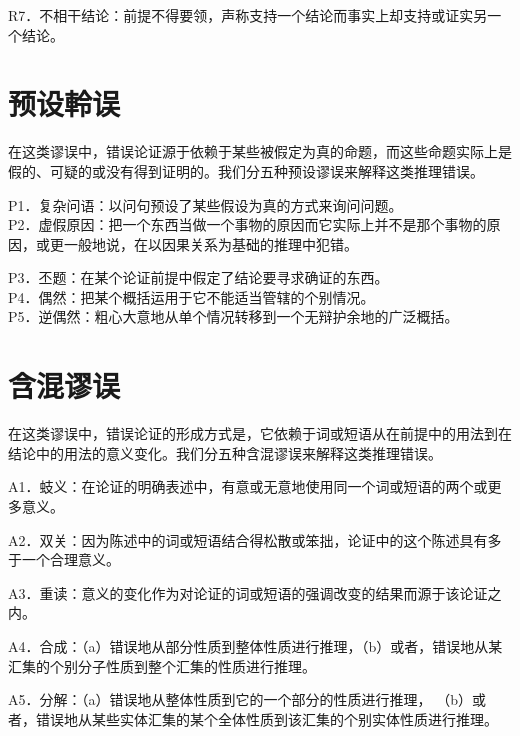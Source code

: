 R7．不相干结论：前提不得要领，声称支持一个结论而事实上却支持或证实另一个结论。

\section*{预设軨误}
在这类谬误中，错误论证源于依赖于某些被假定为真的命题，而这些命题实际上是假的、可疑的或没有得到证明的。我们分五种预设谬误来解释这类推理错误。

P1．复杂问语：以问句预设了某些假设为真的方式来询问问题。\\
P2．虚假原因：把一个东西当做一个事物的原因而它实际上并不是那个事物的原因，或更一般地说，在以因果关系为基础的推理中犯错。

P3．丕题：在某个论证前提中假定了结论要寻求确证的东西。\\
P4．偶然：把某个概括运用于它不能适当管辖的个别情况。\\
P5．逆偶然：粗心大意地从单个情况转移到一个无辩护余地的广泛概括。

\section*{含混谬误}
在这类谬误中，错误论证的形成方式是，它依赖于词或短语从在前提中的用法到在结论中的用法的意义变化。我们分五种含混谬误来解释这类推理错误。

A1．蚑义：在论证的明确表述中，有意或无意地使用同一个词或短语的两个或更多意义。

A2．双关：因为陈述中的词或短语结合得松散或笨拙，论证中的这个陈述具有多于一个合理意义。

A3．重读：意义的变化作为对论证的词或短语的强调改变的结果而源于该论证之内。

A4．合成：（a）错误地从部分性质到整体性质进行推理，（b）或者，错误地从某汇集的个别分子性质到整个汇集的性质进行推理。

A5．分解：（a）错误地从整体性质到它的一个部分的性质进行推理， （b）或者，错误地从某些实体汇集的某个全体性质到该汇集的个别实体性质进行推理。

